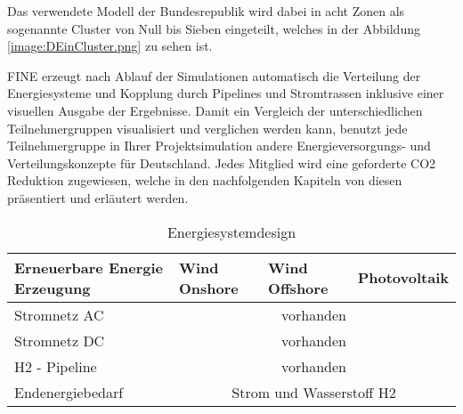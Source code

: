 Das verwendete Modell der Bundesrepublik wird dabei in acht Zonen als sogenannte Cluster von Null bis Sieben eingeteilt, welches in der Abbildung \ref{image:DEinCluster.png} zu sehen ist.


FINE erzeugt nach Ablauf der Simulationen automatisch die Verteilung der Energiesysteme und Kopplung durch Pipelines und Stromtrassen inklusive einer visuellen Ausgabe der Ergebnisse.
Damit ein Vergleich der unterschiedlichen Teilnehmergruppen visualisiert und verglichen werden kann, benutzt jede Teilnehmergruppe in Ihrer Projektsimulation andere Energieversorgungs- und Verteilungskonzepte für Deutschland. Jedes Mitglied wird eine geforderte CO2 Reduktion zugewiesen, welche in den nachfolgenden Kapiteln von diesen präsentiert und erläutert werden.%


\begin{table}[ht!]
    \begin{tabular}{|lcll|}
        \hline
        \multicolumn{1}{|l|}{Erneuerbare Energie Erzeugung} & \multicolumn{1}{l|}{Wind Onshore} & \multicolumn{1}{l|}{Wind Offshore} & Photovoltaik \\ \hline
        \multicolumn{1}{|l|}{Stromnetz AC}     & \multicolumn{3}{c|}{vorhanden}                \\ \hline
        \multicolumn{1}{|l|}{Stromnetz DC}     & \multicolumn{3}{c|}{vorhanden}                \\ \hline
        \multicolumn{1}{|l|}{H2 - Pipeline}    & \multicolumn{3}{c|}{vorhanden}                \\ \hline
        \multicolumn{1}{|l|}{Endenergiebedarf} & \multicolumn{3}{c|}{Strom und Wasserstoff H2} \\ \hline
    \end{tabular}
    \caption{Energiesystemdesign}
    \label{tab:systemdesign}
\end{table}


